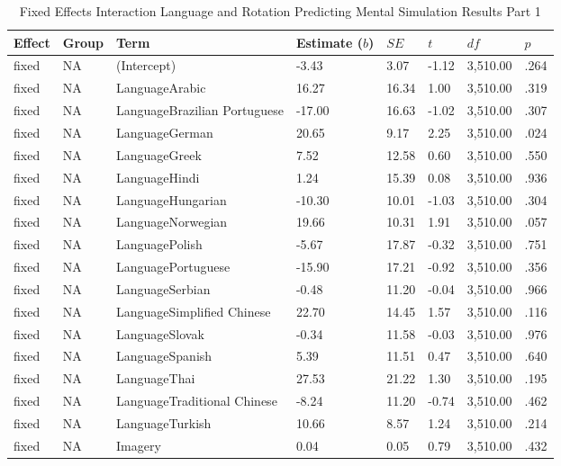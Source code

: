 \documentclass[
  man,mask,floatsintext]{apa7}
\begin{document}
\begin{table}[tbp]

\begin{center}
\begin{threeparttable}

\caption{\label{tab:pred_interact}Fixed Effects Interaction Language and Rotation Predicting Mental Simulation Results Part 1}

\small{

\begin{tabular}{llllllll}
\toprule
Effect & Group & Term & Estimate ($b$) & $SE$ & $t$ & $df$ & $p$\\
\midrule
fixed & NA & (Intercept) & -3.43 & 3.07 & -1.12 & 3,510.00 & .264\\
fixed & NA & LanguageArabic & 16.27 & 16.34 & 1.00 & 3,510.00 & .319\\
fixed & NA & LanguageBrazilian Portuguese & -17.00 & 16.63 & -1.02 & 3,510.00 & .307\\
fixed & NA & LanguageGerman & 20.65 & 9.17 & 2.25 & 3,510.00 & .024\\
fixed & NA & LanguageGreek & 7.52 & 12.58 & 0.60 & 3,510.00 & .550\\
fixed & NA & LanguageHindi & 1.24 & 15.39 & 0.08 & 3,510.00 & .936\\
fixed & NA & LanguageHungarian & -10.30 & 10.01 & -1.03 & 3,510.00 & .304\\
fixed & NA & LanguageNorwegian & 19.66 & 10.31 & 1.91 & 3,510.00 & .057\\
fixed & NA & LanguagePolish & -5.67 & 17.87 & -0.32 & 3,510.00 & .751\\
fixed & NA & LanguagePortuguese & -15.90 & 17.21 & -0.92 & 3,510.00 & .356\\
fixed & NA & LanguageSerbian & -0.48 & 11.20 & -0.04 & 3,510.00 & .966\\
fixed & NA & LanguageSimplified Chinese & 22.70 & 14.45 & 1.57 & 3,510.00 & .116\\
fixed & NA & LanguageSlovak & -0.34 & 11.58 & -0.03 & 3,510.00 & .976\\
fixed & NA & LanguageSpanish & 5.39 & 11.51 & 0.47 & 3,510.00 & .640\\
fixed & NA & LanguageThai & 27.53 & 21.22 & 1.30 & 3,510.00 & .195\\
fixed & NA & LanguageTraditional Chinese & -8.24 & 11.20 & -0.74 & 3,510.00 & .462\\
fixed & NA & LanguageTurkish & 10.66 & 8.57 & 1.24 & 3,510.00 & .214\\
fixed & NA & Imagery & 0.04 & 0.05 & 0.79 & 3,510.00 & .432\\
\bottomrule
\end{tabular}

}

\end{threeparttable}
\end{center}

\end{table}
\end{document}
